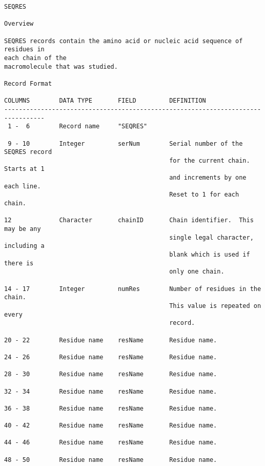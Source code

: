 \begin{lstlisting}
SEQRES 
 
Overview 

SEQRES records contain the amino acid or nucleic acid sequence of residues in
each chain of the 
macromolecule that was studied. 

Record Format 

COLUMNS        DATA TYPE       FIELD         DEFINITION                           
---------------------------------------------------------------------------------
 1 -  6        Record name     "SEQRES"                                           

 9 - 10        Integer         serNum        Serial number of the SEQRES record   
                                             for the current chain.  Starts at 1  
                                             and increments by one each line.     
                                             Reset to 1 for each chain.           

12             Character       chainID       Chain identifier.  This may be any   
                                             single legal character, including a  
                                             blank which is used if there is      
                                             only one chain.                      

14 - 17        Integer         numRes        Number of residues in the chain.     
                                             This value is repeated on every      
                                             record.                              

20 - 22        Residue name    resName       Residue name.                        

24 - 26        Residue name    resName       Residue name.                        

28 - 30        Residue name    resName       Residue name.                        

32 - 34        Residue name    resName       Residue name.                        

36 - 38        Residue name    resName       Residue name.                        

40 - 42        Residue name    resName       Residue name.                        

44 - 46        Residue name    resName       Residue name.                        

48 - 50        Residue name    resName       Residue name.                        


\end{lstlisting}
